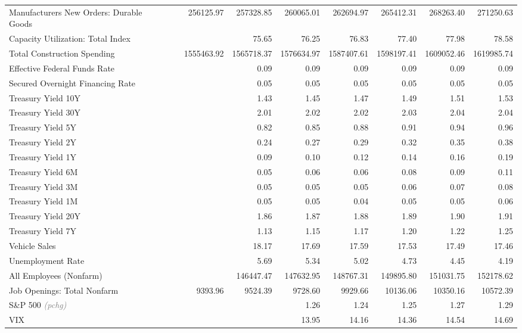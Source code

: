 \documentclass[11pt, letterpaper]{article}\usepackage[]{graphicx}\usepackage[]{color}
\begin{document}
\begin{table}[H]
\begin{tabular}{lrrrrrrrr}
  Manufacturers New Orders: Durable Goods &  & 256125.97 & 257328.85 & 260065.01 & 262694.97 & 265412.31 & 268263.40 & 271250.63 \\ 
  Capacity Utilization: Total Index &  &  & 75.65 & 76.25 & 76.83 & 77.40 & 77.98 & 78.58 \\ 
  Total Construction Spending &  & 1555463.92 & 1565718.37 & 1576634.97 & 1587407.61 & 1598197.41 & 1609052.46 & 1619985.74 \\ 
  Effective Federal Funds Rate &  &  & 0.09 & 0.09 & 0.09 & 0.09 & 0.09 & 0.09 \\ 
  Secured Overnight Financing Rate &  &  & 0.05 & 0.05 & 0.05 & 0.05 & 0.05 & 0.05 \\ 
  Treasury Yield 10Y &  &  & 1.43 & 1.45 & 1.47 & 1.49 & 1.51 & 1.53 \\ 
  Treasury Yield 30Y &  &  & 2.01 & 2.02 & 2.02 & 2.03 & 2.04 & 2.04 \\ 
  Treasury Yield 5Y &  &  & 0.82 & 0.85 & 0.88 & 0.91 & 0.94 & 0.96 \\ 
  Treasury Yield 2Y &  &  & 0.24 & 0.27 & 0.29 & 0.32 & 0.35 & 0.38 \\ 
  Treasury Yield 1Y &  &  & 0.09 & 0.10 & 0.12 & 0.14 & 0.16 & 0.19 \\ 
  Treasury Yield 6M &  &  & 0.05 & 0.06 & 0.06 & 0.08 & 0.09 & 0.11 \\ 
  Treasury Yield 3M &  &  & 0.05 & 0.05 & 0.05 & 0.06 & 0.07 & 0.08 \\ 
  Treasury Yield 1M &  &  & 0.05 & 0.05 & 0.04 & 0.05 & 0.05 & 0.06 \\ 
  Treasury Yield 20Y &  &  & 1.86 & 1.87 & 1.88 & 1.89 & 1.90 & 1.91 \\ 
  Treasury Yield 7Y &  &  & 1.13 & 1.15 & 1.17 & 1.20 & 1.22 & 1.25 \\ 
  Vehicle Sales &  &  & 18.17 & 17.69 & 17.59 & 17.53 & 17.49 & 17.46 \\ 
  Unemployment Rate &  &  & 5.69 & 5.34 & 5.02 & 4.73 & 4.45 & 4.19 \\ 
  All Employees (Nonfarm) &  &  & 146447.47 & 147632.95 & 148767.31 & 149895.80 & 151031.75 & 152178.62 \\ 
  Job Openings: Total Nonfarm &  & 9393.96 & 9524.39 & 9728.60 & 9929.66 & 10136.06 & 10350.16 & 10572.39 \\ 
  S\&P 500 \textit{\footnotesize\textcolor{gray}{(pchg)}} &  &  &  & 1.26 & 1.24 & 1.25 & 1.27 & 1.29 \\ 
  VIX &  &  &  & 13.95 & 14.16 & 14.36 & 14.54 & 14.69 \\ 

\end{tabular}
\end{table}
\end{document}
